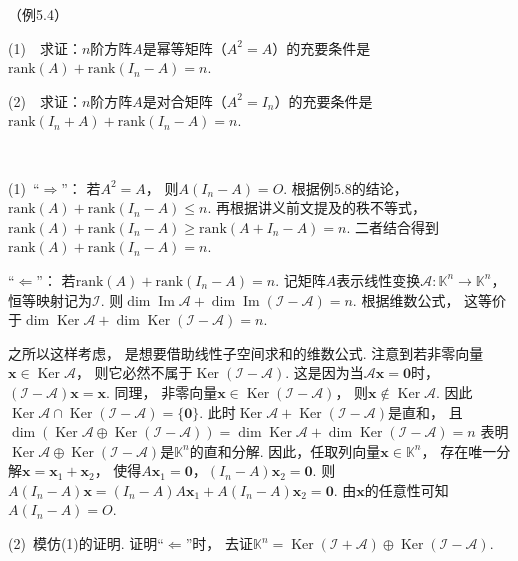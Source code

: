 \begin{example}（例5.4）
    ~

    (1)~~求证：$n$阶方阵$A$是幂等矩阵（$A^2 = A$）的充要条件是$\mathrm{rank}(A) + \mathrm{rank}(I_n - A) = n$.

    (2)~~求证：$n$阶方阵$A$是对合矩阵（$A^2 = I_n$）的充要条件是$\mathrm{rank}(I_n + A) + \mathrm{rank}(I_n - A) = n$.
\end{example}
\smallskip
\begin{pf}
    ~

    (1)~“$\Longrightarrow$”：
    若$A^2 = A$，
    则$A(I_n - A) = O$.
    根据例$5.8$的结论，
    $\mathrm{rank}(A) + \mathrm{rank}(I_n - A) \leq n$.
    再根据讲义前文提及的秩不等式，
    $\mathrm{rank}(A) + \mathrm{rank}(I_n - A) \geq \mathrm{rank}(A + I_n - A) = n$.
    二者结合得到$\mathrm{rank} (A)  + \mathrm{rank} (I_n - A)  = n$.

    \medskip

    “$\Longleftarrow$”：
    若$\mathrm{rank}(A) + \mathrm{rank}(I_n - A) = n$.
    记矩阵$A$表示线性变换$\mathcal{A}: \mathbb{K}^n \to \mathbb{K}^n$，
    恒等映射记为$\mathcal{I}$.
    则$\dim \operatorname{Im} \mathcal{A} + \dim \operatorname{Im} (\mathcal{I} - \mathcal{A}) = n$.
    根据维数公式，
    这等价于$\dim \operatorname{Ker} \mathcal{A} + \dim \operatorname{Ker} (\mathcal{I} - \mathcal{A}) = n$.

    之所以这样考虑，
    是想要借助线性子空间求和的维数公式.
    注意到若非零向量$\bm{x} \in \operatorname{Ker}\mathcal{A}$，
    则它必然不属于$\operatorname{Ker}(\mathcal{I} - \mathcal{A})$.
    这是因为当$\mathcal{A} \bm{x} = \bm{0}$时，
    $(\mathcal{I} - \mathcal{A})\bm{x} = \bm{x}$.
    同理，
    非零向量$\bm{x} \in \operatorname{Ker} (\mathcal{I} - \mathcal{A}) $，
    则$\bm{x} \notin \operatorname{Ker}\mathcal{A}$.
    因此$\operatorname{Ker} \mathcal{A} \cap \operatorname{Ker}  (\mathcal{I} - \mathcal{A}) = \{ \bm{0} \}$.
    此时$\operatorname{Ker} \mathcal{A} + \operatorname{Ker}  (\mathcal{I} - \mathcal{A})$是直和，
    且$\dim (\operatorname{Ker} \mathcal{A} \oplus \operatorname{Ker}  (\mathcal{I} - \mathcal{A})) = \dim \operatorname{Ker} \mathcal{A} + \dim \operatorname{Ker} (\mathcal{I} - \mathcal{A}) = n$
    表明$\operatorname{Ker} \mathcal{A} \oplus \operatorname{Ker}  (\mathcal{I} - \mathcal{A})$是$\mathbb{K}^n$的直和分解.
    因此，任取列向量$\bm{x} \in \mathbb{K}^n$，
    存在唯一分解$\bm{x} = \bm{x}_1 + \bm{x}_2$，
    使得$A\bm{x}_1 = \bm{0}$，$(I_n - A)\bm{x}_2 = \bm{0}$.
    则$A(I_n - A)\bm{x} = (I_n - A)A\bm{x}_1 + A(I_n - A) \bm{x}_2 = \bm{0}$.
    由$\bm{x}$的任意性可知$A(I_n - A) = O$.


    \medskip


    (2)~模仿(1)的证明.
    证明“$\Longleftarrow$”时，
    去证$\mathbb{K}^n = \operatorname{Ker} (\mathcal{I} + \mathcal{A}) \oplus \operatorname{Ker} (\mathcal{I} - \mathcal{A})$.
\end{pf}


